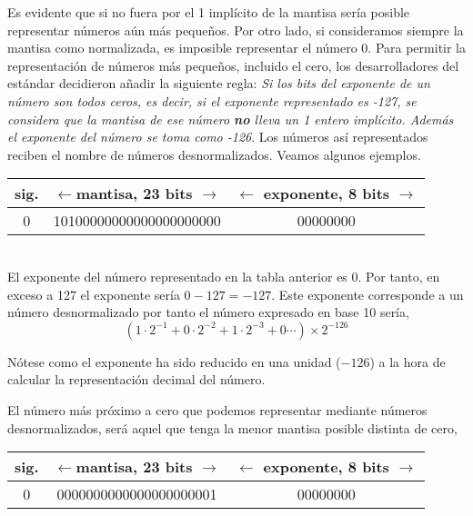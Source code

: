  Es evidente que si no fuera por el 1 implícito de la mantisa sería posible representar números aún más pequeños. Por otro lado, si consideramos siempre la mantisa como normalizada, es imposible representar el número 0. Para permitir la representación de números más pequeños, incluido el cero, los desarrolladores del estándar decidieron añadir la siguiente regla: \emph{Si los bits del exponente de un número son todos ceros, es decir, si el exponente representado es -127, se considera que la mantisa de ese número \textbf{no} lleva un 1 entero implícito. Además el  exponente del número se toma como -126}. Los números así representados reciben el nombre de números desnormalizados. Veamos algunos ejemplos.\\

\begin{tabular}{|c||c||c|}
\hline
sig.&$\leftarrow$mantisa, 23 bits $\rightarrow$&$\leftarrow$ exponente, 8 bits $\rightarrow$\\
\hline
0&10100000000000000000000&00000000\\
\hline
\end{tabular}\\

El exponente del número representado en la tabla anterior es 0. Por tanto, en exceso a 127 el exponente sería $0-127=-127$. Este exponente corresponde a un número desnormalizado por tanto el número expresado en base 10 sería,
\begin{equation*}
(1\cdot 2^{-1}+ 0\cdot 2^{-2}+1\cdot2^{-3}+0\cdots)\times2^{-126}
\end{equation*}

Nótese como el exponente ha sido reducido en una unidad ($-126$) a la hora de calcular la representación decimal del número.

 El número más próximo a cero que podemos representar mediante números desnormalizados, será aquel que tenga la menor mantisa posible distinta de cero,\\ 

\begin{tabular}{|c||c||c|}
\hline
sig.&$\leftarrow$mantisa, 23 bits $\rightarrow$&$\leftarrow$ exponente, 8 bits $\rightarrow$\\
\hline
0&0000000000000000000001&00000000\\
\hline
\end{tabular}\\


